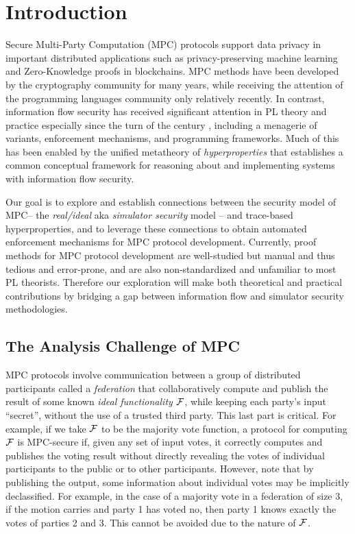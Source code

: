 \section{Introduction}

Secure Multi-Party Computation (MPC) protocols support data privacy in
important distributed applications such as privacy-preserving machine
learning and Zero-Knowledge proofs in blockchains. MPC methods have
been developed by the cryptography community for many years, while
receiving the attention of the programming languages community only
relatively recently. In contrast, information flow security has
received significant attention in PL theory and practice especially
since the turn of the century \cite{1159651}, including a menagerie of
variants, enforcement mechanisms, and programming frameworks. Much of
this has been enabled by the unified metatheory of
\emph{hyperproperties} \cite{10.5555/1891823.1891830} that establishes
a common conceptual framework for reasoning about and implementing
systems with information flow security. 

Our goal is to explore and establish connections between the security
model of MPC-- the \emph{real/ideal} aka \emph{simulator security}
model -- and trace-based hyperproperties, and to leverage these
connections to obtain automated enforcement mechanisms for MPC
protocol development. Currently, proof methods for MPC protocol
development are well-studied \cite{Lindell2017} but manual and 
thus tedious and error-prone, and are also non-standardized and
unfamiliar to most PL theorists. Therefore our exploration will
make both theoretical and practical contributions by bridging a gap between
information flow and simulator security methodologies.

\subsection{The Analysis Challenge of MPC} MPC protocols involve communication
between a group of distributed participants called a \emph{federation}
that collaboratively compute and publish the result of some known
\emph{ideal functionality} $\mathcal{F}$, while keeping each party's input
``secret'', without the use of a trusted third party. This last part
is critical. For example, if we take $\mathcal{F}$ to be the majority vote
function, a protocol for computing $\mathcal{F}$ is MPC-secure if, given
any set of input votes, it correctly computes and publishes the voting
result without directly revealing the votes of individual participants
to the public or to other participants. However, note that by
publishing the output, some information about individual votes may be
implicitly declassified.  For example, in the case of a majority vote
in a federation of size 3, if the motion carries and party 1 has voted
no, then party 1 knows exactly the votes of parties 2 and 3. This
cannot be avoided due to the nature of $\mathcal{F}$.

